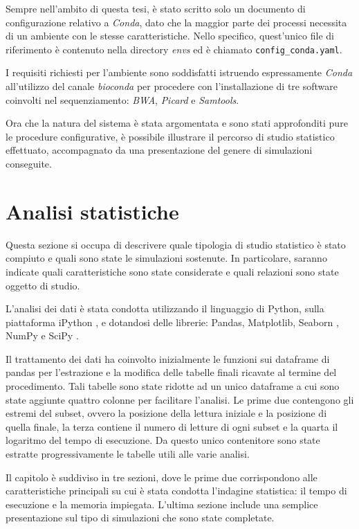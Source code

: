 Sempre nell'ambito di questa tesi, è stato scritto solo un documento di configurazione relativo a \textit{Conda}, dato che la maggior parte dei processi necessita di un ambiente con le stesse caratteristiche.
Nello specifico, quest'unico file di riferimento è contenuto nella directory \textit{envs} ed è chiamato \verb!config_conda.yaml!.

I requisiti richiesti per l'ambiente sono soddisfatti istruendo espressamente \textit{Conda} all'utilizzo del canale \textit{bioconda} per procedere con l'installazione di tre software coinvolti nel sequenziamento: \textit{BWA}, \textit{Picard} e \textit{Samtools}.

Ora che la natura del sistema è stata argomentata e sono stati approfonditi pure le procedure configurative, è possibile illustrare il percorso di studio statistico effettuato, accompagnato da una presentazione del genere di simulazioni conseguite.

\section{Analisi statistiche}
Questa sezione si occupa di descrivere quale tipologia di studio statistico è stato compiuto e quali sono state le simulazioni sostenute. 
In particolare, saranno indicate quali caratteristiche sono state considerate e quali relazioni sono state oggetto di studio.     

L'analisi dei dati è stata condotta utilizzando il linguaggio di Python, sulla piattaforma iPython \cite{IPython}, e dotandosi delle librerie: Pandas, Matplotlib, Seaborn \cite{seaborn}, NumPy \cite{Numpy} e SciPy \cite{Scipy}.

Il trattamento dei dati ha coinvolto inizialmente le funzioni sui dataframe di pandas per l'estrazione e la modifica delle tabelle finali ricavate al termine del procedimento.
Tali tabelle sono state ridotte ad un unico dataframe a cui sono state aggiunte quattro colonne per facilitare l'analisi. 
Le prime due contengono gli estremi del subset, ovvero la posizione della lettura iniziale e la posizione di quella finale, la terza contiene il numero di letture di ogni subset e la quarta il logaritmo del tempo di esecuzione.
Da questo unico contenitore sono state estratte progressivamente le tabelle utili alle varie analisi.

Il capitolo è suddiviso in tre sezioni, dove le prime due corrispondono alle caratteristiche principali su cui è stata condotta l'indagine statistica: il tempo di esecuzione e la memoria impiegata. 
L'ultima sezione include una semplice presentazione sul tipo di simulazioni che sono state completate.


